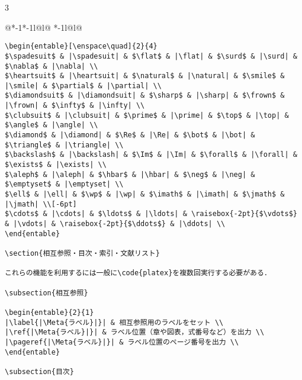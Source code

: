 \documentclass[10pt,a4paper,landscape,dvipdfmx]{jarticle}
\makeatletter
\def\set@etsep#1#2{\def\etcolsep{#1}\def\etitemsep{#2}}
\newenvironment{entable}[3][\quad\qquad]{%
  \set@etsep#1\relax\relax
  \begin{tabular}{%
    @{}*{\the\numexpr#3-1}{*{\the\numexpr#2-1}{l@{\etcolsep}}l@{\etitemsep}}%
    *{\the\numexpr#2-1}{l@{\etcolsep}}l@{}}}{%
  \end{tabular}}
\newcommand*\eghostguarded{%
  \ifmmode \expandafter\@firstofone
  \else \expandafter\pxqgg@eghostguarded@a
  \fi}
\def\pxqgg@eghostguarded@a#1{%
  {\pxqgg@TI\pxqgg@cwm}%
  #1%
  {\pxqgg@TI\pxqgg@cwm}}
\newcommand{\codefont}{\ttfamily\gtfamily}
\newcommand{\code}[1]{\eghostguarded{{\codefont #1}}}
\newcommand{\Meta}[1]{$\langle$\mbox{}\emph{#1}\mbox{}$\rangle$}
\makeatother
\begin{document}
\begin{multicols}{3}
\begin{entable}[\enspace]{2}{1}
\begin{verbatim}
\begin{entable}[\enspace\quad]{2}{4}
$\spadesuit$ & |\spadesuit| & $\flat$ & |\flat| & $\surd$ & |\surd| & $\nabla$ & |\nabla| \\
$\heartsuit$ & |\heartsuit| & $\natural$ & |\natural| & $\smile$ & |\smile| & $\partial$ & |\partial| \\
$\diamondsuit$ & |\diamondsuit| & $\sharp$ & |\sharp| & $\frown$ & |\frown| & $\infty$ & |\infty| \\
$\clubsuit$ & |\clubsuit| & $\prime$ & |\prime| & $\top$ & |\top| & $\angle$ & |\angle| \\
$\diamond$ & |\diamond| & $\Re$ & |\Re| & $\bot$ & |\bot| & $\triangle$ & |\triangle| \\
$\backslash$ & |\backslash| & $\Im$ & |\Im| & $\forall$ & |\forall| & $\exists$ & |\exists| \\
$\aleph$ & |\aleph| & $\hbar$ & |\hbar| & $\neg$ & |\neg| & $\emptyset$ & |\emptyset| \\
$\ell$ & |\ell| & $\wp$ & |\wp| & $\imath$ & |\imath| & $\jmath$ & |\jmath| \\[-6pt]
$\cdots$ & |\cdots| & $\ldots$ & |\ldots| & \raisebox{-2pt}{$\vdots$} & |\vdots| & \raisebox{-2pt}{$\ddots$} & |\ddots| \\
\end{entable}

\section{相互参照・目次・索引・文献リスト}

これらの機能を利用するには一般に\code{platex}を複数回実行する必要がある．

\subsection{相互参照}

\begin{entable}{2}{1}
|\label{|\Meta{ラベル}|}| & 相互参照用のラベルをセット \\
|\ref{|\Meta{ラベル}|}| & ラベル位置（章や図表，式番号など）を出力 \\
|\pageref{|\Meta{ラベル}|}| & ラベル位置のページ番号を出力 \\
\end{entable}

\subsection{目次}


\end{verbatim}
\end{entable}
\end{multicols}
\end{document}
